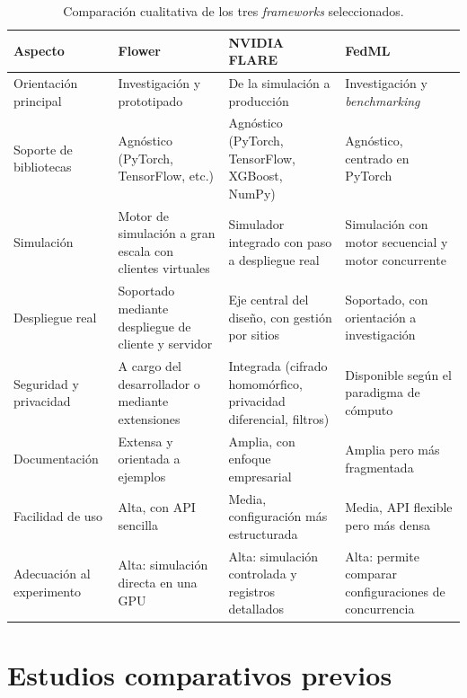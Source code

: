 \begin{table}[htbp]
  \centering
  \caption{Comparación cualitativa de los tres \textit{frameworks} seleccionados.}
  \label{tab:comparativa-frameworks}
  \footnotesize
  \begin{tabular}{p{2.6cm} p{3.2cm} p{3.2cm} p{3.2cm}}
    \toprule
    Aspecto & Flower & NVIDIA FLARE & FedML \\
    \midrule
    Orientación principal & Investigación y prototipado & De la simulación a producción &
    Investigación y \textit{benchmarking} \\
    Soporte de bibliotecas & Agnóstico (PyTorch, TensorFlow, etc.) &
    Agnóstico (PyTorch, TensorFlow, XGBoost, NumPy) & Agnóstico, centrado en PyTorch \\
    Simulación & Motor de simulación a gran escala con clientes virtuales &
    Simulador integrado con paso a despliegue real & Simulación con motor secuencial y
    motor concurrente \\
    Despliegue real & Soportado mediante despliegue de cliente y servidor &
    Eje central del diseño, con gestión por sitios & Soportado, con orientación a
    investigación \\
    Seguridad y privacidad & A cargo del desarrollador o mediante extensiones &
    Integrada (cifrado homomórfico, privacidad diferencial, filtros) &
    Disponible según el paradigma de cómputo \\
    Documentación & Extensa y orientada a ejemplos & Amplia, con enfoque empresarial &
    Amplia pero más fragmentada \\
    Facilidad de uso & Alta, con API sencilla & Media, configuración más estructurada &
    Media, API flexible pero más densa \\
    Adecuación al experimento & Alta: simulación directa en una GPU &
    Alta: simulación controlada y registros detallados & Alta: permite comparar
    configuraciones de concurrencia \\
    \bottomrule
  \end{tabular}
\end{table}

\FloatBarrier
\section{Estudios comparativos previos}\label{sec:comparativas-previas}

